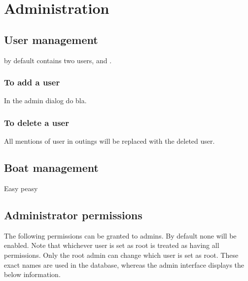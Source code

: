 \chapter{Administration}
\section{User management}
\srl by default contains two users,  and .
\subsection{To add a user}
In the admin dialog do bla.
\subsection{To delete a user}
All mentions of user in outings will be replaced with the deleted user.
\section{Boat management}
Easy peasy


\section{Administrator permissions}
    
    The following permissions can be granted to admins. By default none will be
    enabled. Note that whichever user is set as root is treated as having
    all permissions. Only the root admin can change which user is set as root.
    These exact names are used in the database, whereas the admin interface
    displays the below information.
    
